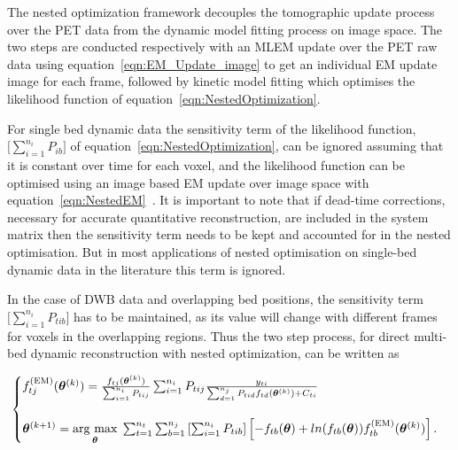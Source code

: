 The nested optimization framework decouples the tomographic update process over the PET data from the dynamic model fitting process on image space. The two steps are conducted respectively with an MLEM update over the PET raw data using equation~\ref{eqn:EM_Update_image} to get an individual EM update image for each frame, followed by kinetic model fitting which optimises the likelihood function of equation~\ref{eqn:NestedOptimization}. 

For single bed dynamic data the sensitivity term of the likelihood function, $\big[\sum_{i=1}^{n_i} P_{ib}\big]$ of equation~\ref{eqn:NestedOptimization}, can be ignored assuming that it is constant over time for each voxel, and the likelihood function can be optimised using an image based EM update over image space with equation~\ref{eqn:NestedEM}~\cite{Wang2010,Reader2014}.
It is important to note that if dead-time corrections, necessary for accurate quantitative reconstruction, are included in the system matrix then the sensitivity term needs to be kept and accounted for in the nested optimisation. But in most applications of nested optimisation on single-bed dynamic data in the literature this term is ignored.

In the case of DWB data and overlapping bed positions, the sensitivity term $\big[\sum_{i=1}^{n_i} P_{tib}\big]$ has to be maintained, as its value will change with different frames for voxels in the overlapping regions.
Thus the two step process, for direct multi-bed dynamic reconstruction with nested optimization, can be written as

\begin{equation}
\label{eq3_3:NestedMultibed}
\text{}
\begin{cases}  
f_{tj}^{(\textrm{EM})}(\bm\theta^{(k)}) = \frac{f_{tj}(\bm\theta^{(k)})}{\sum_{i=1}^{n_i} P_{tij}} 
\sum_{i=1}^{n_i} P_{tij} 
\frac{y_{ti}}{\sum_{d=1}^{n_j} P_{tid} f_{td}(\bm\theta^{(k)}) + C_{ti} } \\ \\
\bm{\theta}^{(k+1)} = \underset{\bm{\theta}}{\operatorname{arg}\,\operatorname{max}}\; 
\sum_{t=1}^{n_t} \sum_{b=1}^{n_j} \left[ \sum_{i=1}^{n_i}  P_{tib} \right]
\left[ -f_{tb}(\bm\theta) + 
ln( f_{tb}(\bm\theta)) 
f_{tb}^{(\mathrm{EM})}(\bm{\theta}^{(k)})
\right] .\\
\end{cases}
\end{equation}

